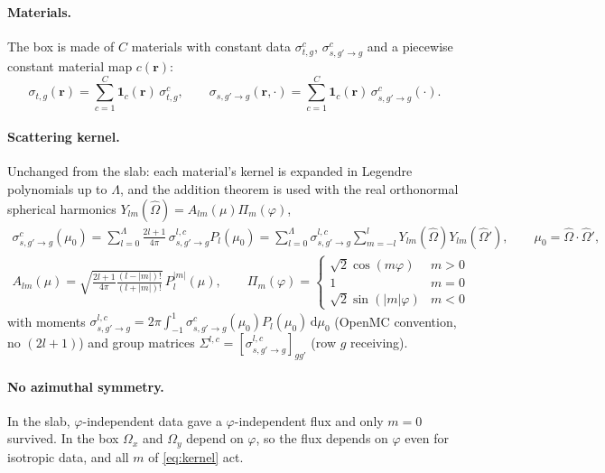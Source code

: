 \documentclass[11pt,a4paper]{article}
\newcommand{\Om}{\hat{\Omega}}
\newcommand{\dd}{\mathrm{d}}
\newcommand{\Lmax}{\Lambda}
\begin{document}
\paragraph{Materials.} The box is made of $C$ materials with constant data $\sigma^c_{t,g}$, $\sigma^{c}_{s,g'\to g}$ and a piecewise constant material map $c(\bm r)$:
\begin{equation}
\sigma_{t,g}(\bm r)=\sum_{c=1}^{C}\mathbf{1}_c(\bm r)\,\sigma^c_{t,g},\qquad
\sigma_{s,g'\to g}(\bm r,\cdot)=\sum_{c=1}^{C}\mathbf{1}_c(\bm r)\,\sigma^c_{s,g'\to g}(\cdot).
\label{eq:materials}
\end{equation}

\paragraph{Scattering kernel.} Unchanged from the slab: each material's kernel is expanded in Legendre polynomials up to $\Lmax$, and the addition theorem is used with the real orthonormal spherical harmonics $Y_{lm}(\Om)=A_{lm}(\mu)\Pi_m(\varphi)$,
\begin{gather}
\sigma^c_{s,g'\to g}(\mu_0)=\sum_{l=0}^{\Lmax}\frac{2l+1}{4\pi}\,\sigma^{l,c}_{s,g'\to g}P_l(\mu_0)
=\sum_{l=0}^{\Lmax}\sigma^{l,c}_{s,g'\to g}\sum_{m=-l}^{l}Y_{lm}(\Om)Y_{lm}(\Om'),\qquad \mu_0=\Om\cdot\Om',
\label{eq:kernel}\\
A_{lm}(\mu)=\sqrt{\tfrac{2l+1}{4\pi}\tfrac{(l-|m|)!}{(l+|m|)!}}\,P_l^{|m|}(\mu),\qquad
\Pi_m(\varphi)=\begin{cases}\sqrt2\cos(m\varphi)&m>0\\1&m=0\\\sqrt2\sin(|m|\varphi)&m<0\end{cases}
\end{gather}
with moments $\sigma^{l,c}_{s,g'\to g}=2\pi\int_{-1}^1\sigma^c_{s,g'\to g}(\mu_0)P_l(\mu_0)\,\dd\mu_0$ (OpenMC convention, no $(2l+1)$) and group matrices $\Sigma^{l,c}=[\sigma^{l,c}_{s,g'\to g}]_{gg'}$ (row $g$ receiving).

\paragraph{No azimuthal symmetry.} In the slab, $\varphi$-independent data gave a $\varphi$-independent flux and only $m=0$ survived. In the box $\Omega_x$ and $\Omega_y$ depend on $\varphi$, so the flux depends on $\varphi$ even for isotropic data, and all $m$ of \eqref{eq:kernel} act.

\end{document}
